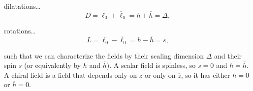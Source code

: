 dilatations\dots
\[
    D = \ell_0 + \overline{\ell}_0 = h + \overline{h} = \Delta,
\]

rotations\dots
\[
    L = \ell_0 - \overline{\ell}_0 = h - \overline{h} = s,
\]

such that we can characterize the fields by their scaling dimension \(\Delta\) and their spin \(s\) (or equivalently by \(h\) and \(\overline{h}\)). A scalar field is spinless, so \(s=0\) and \(h = \overline{h}\). A chiral field is a field that depends only on \(z\) or only on \(\overline{z}\), so it has either \(h=0\) or \(\overline{h}=0\).